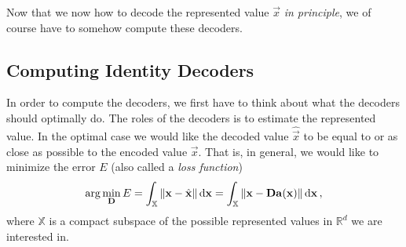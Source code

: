 \documentclass[10pt,letterpaper,oneside]{article}
\begin{document}
Now that we now how to decode the represented value $\vec x$ \emph{in principle}, we of course have to somehow compute these decoders.


\subsection{Computing Identity Decoders}

In order to compute the decoders, we first have to think about what the decoders should optimally do. The roles of the decoders is to estimate the represented value. In the optimal case we would like the decoded value $\hat{\vec x}$ to be equal to or as close as possible to the encoded value $\vec x$. That is, in general, we would like to minimize the error $E$ (also called a \emph{loss function})
\begin{align}
	\arg\min_{{\mathbf{D}}} E = \int_{\mathbb{X}} \|{\mathbf{x}} - \hat{{\mathbf{x}}}\| \,\mathrm{d}{\mathbf{x}} = \int_{\mathbb{X}} \|{\mathbf{x}} - {\mathbf{D}} {\mathbf{a}}({\mathbf{x}})\| \,\mathrm{d}{\mathbf{x}} \,,
	\label{eqn:optimisation_problem}
\end{align}
where $\mathbb{X}$ is a compact subspace of the possible represented values in $\mathbb{R}^d$ we are interested in.

\newpage

\end{document}
